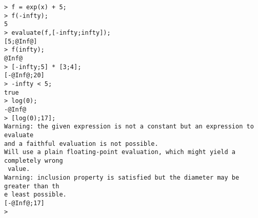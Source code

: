 \begin{center}\begin{minipage}{15cm}\begin{Verbatim}[frame=single]
> f = exp(x) + 5;
> f(-infty);
5
> evaluate(f,[-infty;infty]);
[5;@Inf@]
> f(infty);
@Inf@
> [-infty;5] * [3;4];
[-@Inf@;20]
> -infty < 5;
true
> log(0);
-@Inf@
> [log(0);17];
Warning: the given expression is not a constant but an expression to evaluate
and a faithful evaluation is not possible.
Will use a plain floating-point evaluation, which might yield a completely wrong
 value.
Warning: inclusion property is satisfied but the diameter may be greater than th
e least possible.
[-@Inf@;17]
> 
\end{Verbatim}
\end{minipage}\end{center}
